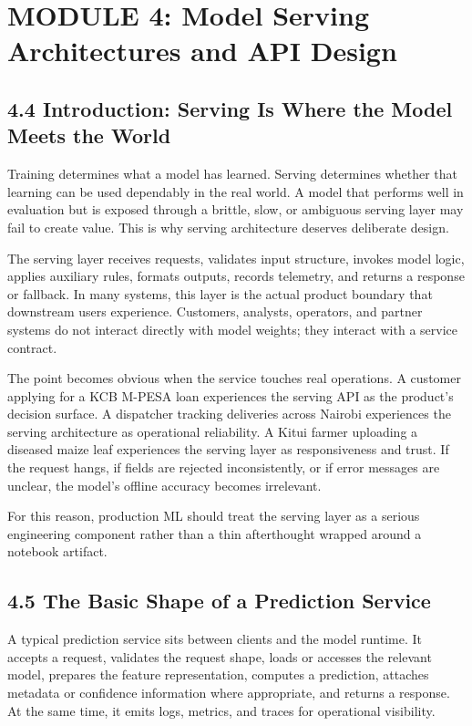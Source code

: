\documentclass[12pt,a4paper]{article}
\begin{document}
\section*{MODULE 4: Model Serving Architectures and API Design}

\subsection*{4.4 Introduction: Serving Is Where the Model Meets the World}
Training determines what a model has learned. Serving determines whether that learning can be used dependably in the real world. A model that performs well in evaluation but is exposed through a brittle, slow, or ambiguous serving layer may fail to create value. This is why serving architecture deserves deliberate design.

The serving layer receives requests, validates input structure, invokes model logic, applies auxiliary rules, formats outputs, records telemetry, and returns a response or fallback. In many systems, this layer is the actual product boundary that downstream users experience. Customers, analysts, operators, and partner systems do not interact directly with model weights; they interact with a service contract.

The point becomes obvious when the service touches real operations. A customer applying for a KCB M-PESA loan experiences the serving API as the product’s decision surface. A dispatcher tracking deliveries across Nairobi experiences the serving architecture as operational reliability. A Kitui farmer uploading a diseased maize leaf experiences the serving layer as responsiveness and trust. If the request hangs, if fields are rejected inconsistently, or if error messages are unclear, the model’s offline accuracy becomes irrelevant.

For this reason, production ML should treat the serving layer as a serious engineering component rather than a thin afterthought wrapped around a notebook artifact.

\subsection*{4.5 The Basic Shape of a Prediction Service}
A typical prediction service sits between clients and the model runtime. It accepts a request, validates the request shape, loads or accesses the relevant model, prepares the feature representation, computes a prediction, attaches metadata or confidence information where appropriate, and returns a response. At the same time, it emits logs, metrics, and traces for operational visibility.
\end{document}
